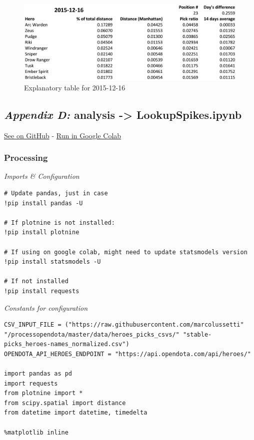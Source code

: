 \begin{figure}[H]
    \centering
    \caption{Explanatory table for 2015-12-16}
    \label{fig:20151216}
    \includegraphics[width=1\textwidth]{20151216.png}
\end{figure}

\clearpage

\subsection*{\emph{Appendix D:} analysis -> LookupSpikes.ipynb}
\label{subsec:lookup-spikes}

\href{https://github.com/marcolussetti/opendotadump-tools/blob/master/analysis/heroes_picks/LookupSpikes.ipynb}{See on GitHub} - \href{https://colab.research.google.com/github/marcolussetti/opendotadump-tools/blob/master/analysis/heroes_picks/LookupSpikes.ipynb}{Run in Google Colab}

\subsubsection*{Processing}

\emph{Imports \& Configuration}

\begin{verbatim}
# Update pandas, just in case
!pip install pandas -U

# If plotnine is not installed:
!pip install plotnine

# If using on google colab, might need to update statsmodels version
!pip install statsmodels -U

# If not installed
!pip install requests
\end{verbatim}

\emph{Constants for configuration}

\begin{verbatim}
CSV_INPUT_FILE = ("https://raw.githubusercontent.com/marcolussetti" "/processopendota/master/data/heroes_picks_csvs/" "stable-picks_heroes-names_normalized.csv")
OPENDOTA_API_HEROES_ENDPOINT = "https://api.opendota.com/api/heroes/"

import pandas as pd
import requests
from plotnine import *
from scipy.spatial import distance
from datetime import datetime, timedelta

%matplotlib inline
\end{verbatim}

